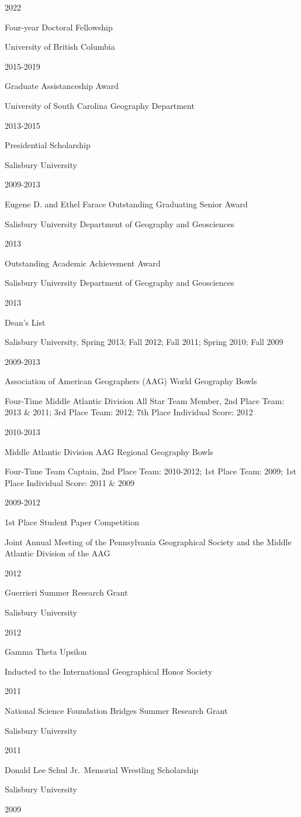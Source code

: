 \documentclass[
]{article}
\begin{document}
2022

Four-year Doctoral Fellowship

University of British Columbia

2015-2019

Graduate Assistanceship Award

University of South Carolina Geography Department

2013-2015

Presidential Scholarship

Salisbury University

2009-2013

Eugene D. and Ethel Farace Outstanding Graduating Senior Award

Salisbury University Department of Geography and Geosciences

2013

Outstanding Academic Achievement Award

Salisbury University Department of Geography and Geosciences

2013

Dean's List

Salisbury University, Spring 2013; Fall 2012; Fall 2011; Spring 2010;
Fall 2009

2009-2013

Association of American Geographers (AAG) World Geography Bowls

Four-Time Middle Atlantic Division All Star Team Member, 2nd Place Team:
2013 \& 2011; 3rd Place Team: 2012; 7th Place Individual Score: 2012

2010-2013

Middle Atlantic Division AAG Regional Geography Bowls

Four-Time Team Captain, 2nd Place Team: 2010-2012; 1st Place Team: 2009;
1st Place Individual Score: 2011 \& 2009

2009-2012

1st Place Student Paper Competition

Joint Annual Meeting of the Pennsylvania Geographical Society and the
Middle Atlantic Division of the AAG

2012

Guerrieri Summer Research Grant

Salisbury University

2012

Gamma Theta Upsilon

Inducted to the International Geographical Honor Society

2011

National Science Foundation Bridges Summer Research Grant

Salisbury University

2011

Donald Lee Schul Jr.~Memorial Wrestling Scholarship

Salisbury University

2009
\end{document}
